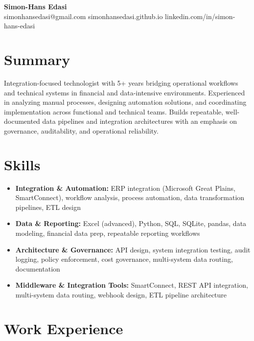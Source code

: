 \documentclass[11pt,a4paper]{article}
\begin{document}
\begin{center}
    {\LARGE \textbf{Simon-Hans Edasi}} \\[6pt]
    simonhansedasi@gmail.com \hfill \textbar \hfill
    simonhansedasi.github.io \hfill \textbar \hfill
    linkedin.com/in/simon-hans-edasi
\end{center}

\section*{Summary}
Integration-focused technologist with 5+ years bridging operational workflows and technical systems
in financial and data-intensive environments. Experienced in analyzing manual processes, designing
automation solutions, and coordinating implementation across functional and technical teams. Builds
repeatable, well-documented data pipelines and integration architectures with an emphasis on
governance, auditability, and operational reliability.

\section*{Skills}
\begin{itemize}
  \item \textbf{Integration \& Automation:} ERP integration (Microsoft Great Plains, SmartConnect),
        workflow analysis, process automation, data transformation pipelines, ETL design
  \item \textbf{Data \& Reporting:} Excel (advanced), Python, SQL, SQLite, pandas, data modeling,
        financial data prep, repeatable reporting workflows
  \item \textbf{Architecture \& Governance:} API design, system integration testing, audit logging,
        policy enforcement, cost governance, multi-system data routing, documentation
  \item \textbf{Middleware \& Integration Tools:} SmartConnect, REST API integration, multi-system
        data routing, webhook design, ETL pipeline architecture
\end{itemize}

\section*{Work Experience}
\end{document}
